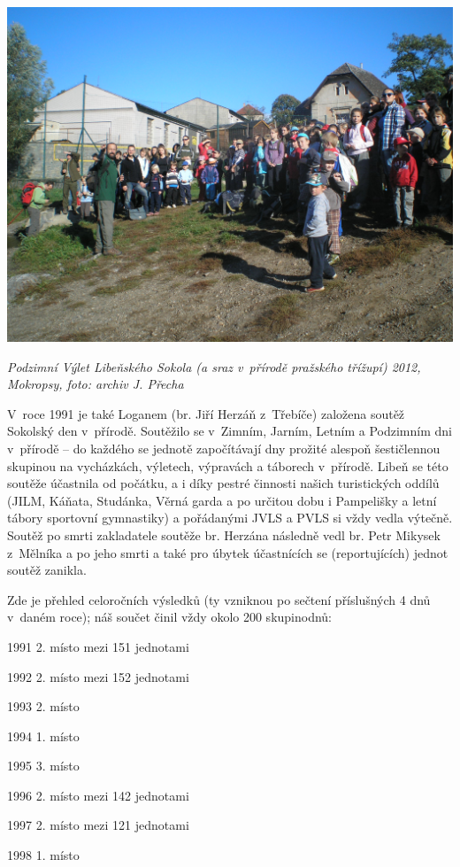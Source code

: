 \documentclass[a5paper, 11pt, twoside]{article}
\begin{document}
 \includegraphics[width=\textwidth]{img/39_pvls.JPG}

\textit{Podzimní Výlet Libeňského Sokola (a sraz v~přírodě pražského
třížupí) 2012, Mokropsy, foto: archiv J. Přecha}

V~roce 1991 je také Loganem (br. Jiří Herzáň z~Třebíče) založena soutěž
Sokolský den v~přírodě. Soutěžilo se v~Zimním, Jarním, Letním a
Podzimním dni v~přírodě -- do každého se jednotě započítávají dny
prožité alespoň šestičlennou skupinou na vycházkách, výletech, výpravách
a táborech v~přírodě. Libeň se této soutěže účastnila od počátku, a i
díky pestré činnosti našich turistických oddílů (JILM, Káňata, Studánka,
Věrná garda a po určitou dobu i Pampelišky a letní tábory sportovní
gymnastiky) a pořádanými JVLS a PVLS si vždy vedla výtečně. Soutěž po
smrti zakladatele soutěže br. Herzána následně vedl br. Petr Mikysek
z~Mělníka a po jeho smrti a také pro úbytek účastnících se (reportujících)
jednot soutěž zanikla.

Zde je přehled celoročních výsledků (ty vzniknou po sečtení příslušných
4 dnů v~daném roce); náš součet činil vždy okolo 200 skupinodnů:

1991 2. místo mezi 151 jednotami

1992 2. místo mezi 152 jednotami

1993 2. místo

1994 1. místo

1995 3. místo

1996 2. místo mezi 142 jednotami

1997 2. místo mezi 121 jednotami

1998 1. místo
\end{document}
